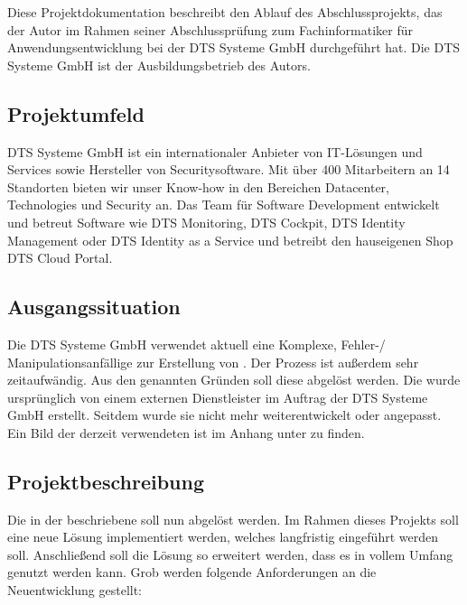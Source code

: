 Diese Projektdokumentation beschreibt den Ablauf des Abschlussprojekts, das der Autor im Rahmen seiner Abschlussprüfung zum Fachinformatiker für Anwendungsentwicklung bei der DTS Systeme GmbH durchgeführt hat. Die DTS Systeme GmbH ist der Ausbildungsbetrieb des Autors.

\subsection{Projektumfeld}
\label{sec:Einführung-Definitionsphase:Projektumfeld}

DTS Systeme GmbH ist ein internationaler Anbieter von IT-Lösungen und Services sowie Hersteller von Securitysoftware. Mit über 400 Mitarbeitern an 14 Standorten bieten wir unser Know-how in den Bereichen Datacenter, Technologies und Security an.
Das Team für Software Development entwickelt und betreut Software wie DTS Monitoring, DTS Cockpit, DTS Identity Management oder DTS Identity as a Service und betreibt den hauseigenen Shop DTS Cloud Portal.

\subsection{Ausgangssituation}
\label{sec:Einführung-Definitionsphase:Ausgangssituation}

Die DTS Systeme GmbH verwendet aktuell eine Komplexe, Fehler-/ Manipulationsanfällige  zur Erstellung von . Der Prozess ist außerdem sehr zeitaufwändig. Aus den genannten Gründen soll diese  abgelöst werden.
Die  wurde ursprünglich von einem externen Dienstleister im Auftrag der DTS Systeme GmbH erstellt. Seitdem wurde sie nicht mehr weiterentwickelt oder angepasst.
Ein Bild der derzeit verwendeten  ist im Anhang unter  zu finden.


\subsection{Projektbeschreibung}
\label{sec:Einführung-Definitionsphase:Projektbeschreibung}

Die in der  beschriebene  soll nun abgelöst werden.
Im Rahmen dieses Projekts soll eine neue Lösung implementiert werden, welches langfristig eingeführt werden soll. Anschließend soll die Lösung so erweitert werden, dass es in vollem Umfang genutzt werden kann.
Grob werden folgende Anforderungen an die Neuentwicklung gestellt:

